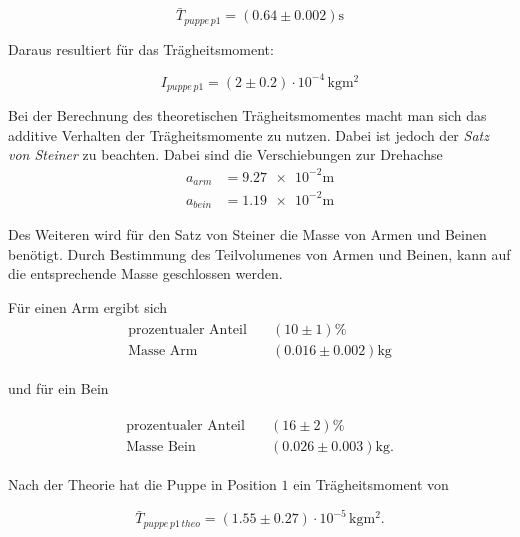 \begin{equation*}
\bar{T}_{puppe\, p1}=\left(\num{0.64}\pm\num{0.002}\right) \si{\second}
\end{equation*}

Daraus resultiert für das Trägheitsmoment:

\begin{equation}
\label{eq:traeg_puppe_p1}
I_{puppe \,p1}= \left(\num{2}\pm\num{0.2}\right)\cdot 10^{-4} \,\si{\kilogram\meter\squared}
\end{equation}

Bei der Berechnung des theoretischen Trägheitsmomentes macht man sich
das additive Verhalten der Trägheitsmomente zu nutzen.
Dabei ist jedoch der \emph{Satz von Steiner} zu beachten.
 Dabei sind die Verschiebungen zur Drehachse
\begin{align*}
a_{arm}&=\num{9.27e-2}\si{\meter}\\
a_{bein}&=\num{1.19e-2}\si{\meter}
\end{align*}

Des Weiteren wird für den Satz von Steiner die Masse von Armen und Beinen benötigt.
Durch Bestimmung des Teilvolumenes von Armen und Beinen, kann auf die entsprechende Masse
geschlossen werden.

Für einen Arm ergibt sich
\begin{align}
\begin{aligned}
\label{eq:masse_arm}
\text{prozentualer Anteil} \quad &\left(10\pm\num{1}\right)\% \\
\text{Masse Arm} \quad &\left(\num{0.016}\pm\num{0.002}\right)\si{\kilogram}
\end{aligned}
\end{align}

und für ein Bein

\begin{align}
\begin{aligned}
\label{eq:masse_bein}
\text{prozentualer Anteil} \quad &\left(16\pm\num{2}\right)\% \\
\text{Masse Bein} \quad &\left(\num{0.026}\pm\num{0.003}\right)\si{\kilogram}.
\end{aligned}
\end{align}

Nach der Theorie hat die Puppe in Position $1$ ein Trägheitsmoment von

\begin{equation*}
\bar{T}_{puppe\, p1\,theo}=\left(\num{1.55}\pm\num{0.27}\right)\cdot 10^{-5} \, \si{\kilogram\meter\squared}.
\end{equation*}

